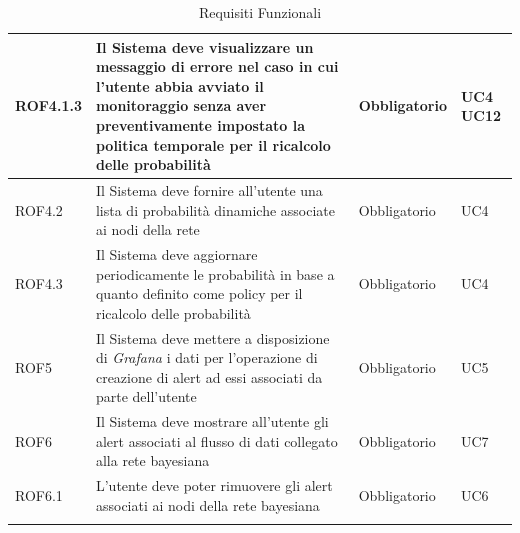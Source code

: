 \begin{center}
\begin{longtable}[c]{|m{}|m{}|m{}|m{}|}
\hline
\rowcolor{grigio}ROF4.1.3 & Il Sistema deve visualizzare un messaggio di errore nel caso in cui l'utente abbia avviato il monitoraggio senza aver preventivamente impostato la politica temporale per il ricalcolo delle probabilità & Obbligatorio & UC4 UC12\\
\hline
ROF4.2 & Il Sistema deve fornire all'utente una lista di probabilità dinamiche associate ai nodi della rete & Obbligatorio & UC4\\
\hline
\rowcolor{grigio}ROF4.3 & Il Sistema deve aggiornare periodicamente le probabilità in base a quanto definito come policy per il ricalcolo delle probabilità & Obbligatorio & UC4\\
\hline
ROF5 & Il Sistema deve mettere a disposizione di \textit{Grafana} i dati per l'operazione di creazione di alert ad essi associati da parte dell'utente & Obbligatorio & UC5\\
\hline
\rowcolor{grigio}ROF6 & Il Sistema deve mostrare all'utente gli alert associati al flusso di dati collegato alla rete bayesiana & Obbligatorio & UC7\\ 
\hline
ROF6.1 & L'utente deve poter rimuovere gli alert associati ai nodi della rete bayesiana & Obbligatorio & UC6\\ 
\hline
\caption{Requisiti Funzionali}
\end{longtable}
\end{center}




